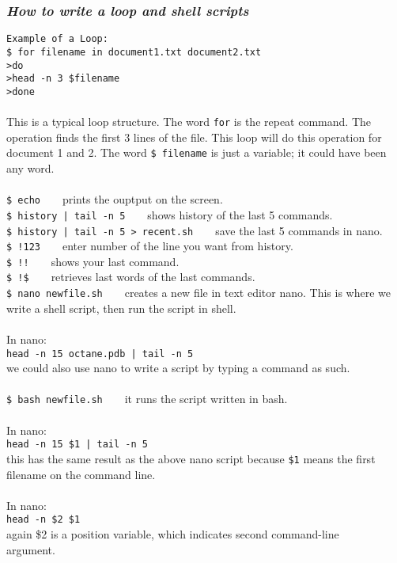 \documentclass{article}
\begin{document}
\subsubsection{\small\textsl{How to write a loop and shell scripts }}\texttt{Example of a Loop:}\\
\texttt{\$ for filename in document1.txt document2.txt}\\
\texttt{>do}\\
\texttt{>}\indent \indent \texttt{head -n 3 \$filename}\\
\texttt{>done}\\
\\
This is a typical loop structure. The word \texttt{for} is the repeat command. The operation finds the first 3 lines of the file. This loop will do this operation for document 1 and 2. The word \texttt{\$ filename} is just a variable; it could have been any word.\\
\\
\texttt{\$ echo} ~ ~ prints the ouptput on the screen.\\
\texttt{\$ history | tail -n 5} ~ ~ shows history of the last 5 commands.\\
\texttt{\$ history | tail -n 5 > recent.sh} ~ ~ save the last 5 commands in nano.\\
\texttt{\$ !123} ~ ~ enter number of the line you want from history. \\
\texttt{\$ !!} ~ ~ shows your last command.\\
\texttt{\$ !\$} ~ ~ retrieves last words of the last commands.\\
\texttt{\$ nano newfile.sh} ~ ~ creates a new file in text editor nano. This is where we write a shell script, then run the script in shell.\\
\\
In nano:\\ 
\indent\texttt{head -n 15 octane.pdb | tail -n 5}\\
\indent we could also use nano to write a script by typing a command as such. \\
\\
\texttt{\$ bash newfile.sh} ~ ~ it runs the script written in bash.\\
\\
In nano:\\
\indent\texttt{head -n 15 \$1 | tail -n 5}\\
\indent this has the same result as the above nano script because \texttt{\$1} means the first \\
\indent filename on the command line. \\
\\
In nano:\\
\indent \texttt{head -n \$2 \$1}\\
\indent again \$2 is a position variable, which indicates second command-line \\
\indent argument.
\end{document}

